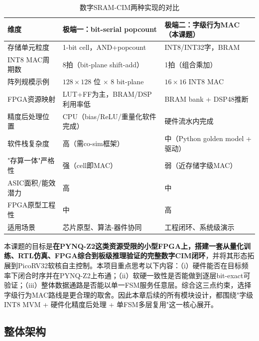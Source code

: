 \documentclass[12pt, a4paper]{article}
\begin{document}
\begin{table}[H]
	\centering
	\caption{数字SRAM-CIM两种实现的对比}
	\label{tab:two_extremes}
	\small
	\begin{tabular}{p{3.0cm}|p{5.0cm}|p{5.0cm}}
		\hline
		\textbf{维度} & \textbf{极端一：bit-serial popcount} & \textbf{极端二：字级行为MAC（本课题）} \\
		\hline
		存储单元粒度 & 1-bit cell，AND+popcount & INT8/INT32字，BRAM \\
		\hline
		INT8 MAC周期数 & 8拍（bit-plane shift-add） & 1拍（组合乘加） \\
		\hline
		阵列规模示例 & $128\times128$ 位 $\times$ 8 bit-plane & $16\times16$ INT8 MAC \\
		\hline
		FPGA资源映射 & LUT+FF为主，BRAM/DSP利用率低 & BRAM bank + DSP48推断 \\
		\hline
		精度后处理位置 & CPU（bias/ReLU/重量化软件完成） & 硬件流水内完成 \\
		\hline
		软件栈复杂度 & 高（需co-sim框架） & 中（Python golden model + 驱动） \\
		\hline
		"存算一体"严格性 & 强（cell即MAC） & 弱（近存储字级MAC） \\
		\hline
		ASIC面积/能效潜力 & 高 & 中 \\
		\hline
		FPGA原型工程性 & 中 & 高 \\
		\hline
		适用场景 & 芯片原型、算法-器件协同 & 工程闭环、系统级演示 \\
		\hline
	\end{tabular}
\end{table}

本课题的目标是\textbf{在PYNQ-Z2这类资源受限的小型FPGA上，搭建一套从量化训练、RTL仿真、FPGA综合到板级推理验证的完整数字CIM闭环}，并将其形态拓展到PicoRV32软核自主控制。本项目重点思考以下内容：（i）硬件能否在目标频率下闭合时序并在PYNQ-Z2上布通；（ii）软硬一致性是否能做到逐层bit-exact可验证；（iii）整体数据通路是否能以单一FSM服务任意层。综合这三点约束，选择字级行为MAC路线是更合理的取舍。因此本章后续的所有模块设计，都围绕"字级INT8 MVM + 硬件化精度后处理 + 单FSM多层复用"这一核心展开。

\subsection{整体架构}
\end{document}
